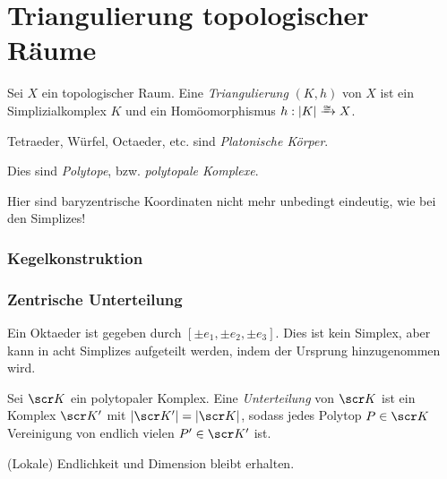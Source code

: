 \section{Triangulierung topologischer Räume}


\begin{df}
	Sei $X$ ein topologischer Raum.
	Eine \emph{Triangulierung} $(K, h)$ von $X$ ist ein Simplizialkomplex $K$ und ein Homöomorphismus $h: |K| \homto X$.
\end{df}


\begin{ex}

	Tetraeder, Würfel, Octaeder, etc. sind \emph{Platonische Körper}.

	Dies sind \emph{Polytope}, bzw. \emph{polytopale Komplexe}.

	Hier sind baryzentrische Koordinaten nicht mehr unbedingt eindeutig, wie bei den Simplizes!
\end{ex}

\subsubsection{Kegelkonstruktion}


\subsubsection{Zentrische Unterteilung}



Ein Oktaeder ist gegeben durch $[\pm e_1, \pm e_2, \pm e_3]$.
Dies ist kein Simplex, aber kann in acht Simplizes aufgeteilt werden, indem der Ursprung hinzugenommen wird.

\begin{df}
	Sei $\scr K$ ein polytopaler Komplex.
	Eine \emph{Unterteilung} von $\scr K$ ist ein Komplex $\scr K'$ mit $|\scr K'| = |\scr K|$, sodass jedes Polytop $P \in \scr K$ Vereinigung von endlich vielen $P' \in \scr K'$ ist.
	\begin{note}
		(Lokale) Endlichkeit und Dimension bleibt erhalten.
	\end{note}
\end{df}

